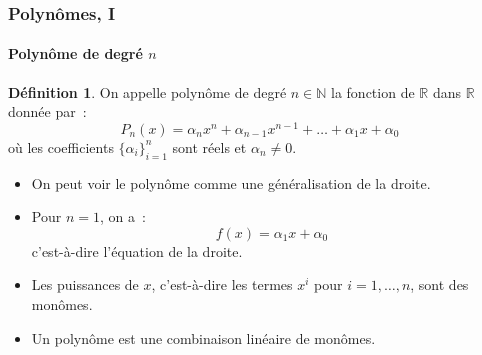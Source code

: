\documentclass[10pt,notheorems]{beamer}
\theoremstyle{plain}
\theoremstyle{definition} %
\newtheorem{definition}{Définition}
\begin{document}
\begin{frame}
  \frametitle{Polynômes, I}
  \framesubtitle{Polynôme de degré $n$}
  \hypertarget{slide_polynome_definition}{}

  \bigskip

  \begin{definition}
    On appelle polynôme de degré $n\in\mathbb N$ la fonction de $\mathbb R$ dans $\mathbb R$ donnée par~:
    \[
      P_n(x) = \alpha_n x^n + \alpha_{n-1}x^{n-1}+\ldots+\alpha_1x+\alpha_0
    \]
    où les coefficients $\{\alpha_i\}_{i=1}^n$ sont réels et $\alpha_n\neq 0$.
  \end{definition}

  \bigskip

  \begin{itemize}

  \item On peut voir le polynôme comme une généralisation de la droite.\newline

  \item Pour $n=1$, on a~:
    \[
      f(x) = \alpha_1 x + \alpha_0
    \]
    c'est-à-dire l'équation de la droite.\newline

  \item Les puissances de $x$, c'est-à-dire les termes $x^i$ pour $i=1,\ldots,n$, sont des monômes.\newline

  \item Un polynôme est une combinaison linéaire de monômes.

  \end{itemize}

\end{frame}
\end{document}
